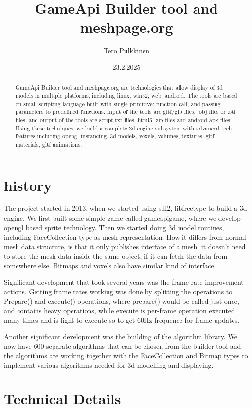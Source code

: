 \documentclass[11pt,twoside,a4paper]{article}
\begin{document}
\title{GameApi Builder tool and meshpage.org}
\author{Tero Pulkkinen}
\date{23.2.2025}
\maketitle
\begin{abstract}
  GameApi Builder tool and meshpage.org are technologies that allow display of 3d models in multiple platforms, including linux, win32, web, android. The tools are based on small scripting language built with single primitive: function call, and passing parameters to predefined functions. Input of the tools are gltf/glb files, .obj files or .stl files, and output of the tools are script.txt files, html5 .zip files and android apk files. Using these techniques, we build a complete 3d engine subsystem with advanced tech features including opengl instancing, 3d models, voxels, volumes, textures, gltf materials, gltf animations.
\end{abstract}

\section{history}
The project started in 2013, when we started using sdl2, libfreetype to build a 3d engine. We first built some simple game called gameapigame, where we develop opengl based sprite technology. Then we started doing 3d model routines, including FaceCollection type as mesh representation. How it differs from normal mesh data structure, is that it only publishes interface of a mesh, it doesn't need to store the mesh data inside the same object, if it can fetch the data from somewhere else. Bitmaps and voxels also have similar kind of interface.

Significant development that took several years was the frame rate improvement actions. Getting frame rates working was done by splitting the operations to Prepare() and execute() operations, where prepare() would be called just once, and contains heavy operations, while execute is per-frame operation executed many times and is light to execute so to get 60Hz frequence for frame updates.

Another significant development was the building of the algorithm library. We now have 600 separate algorithms that can be chosen from the builder tool and the algorithms are working together with the FaceCollection and Bitmap types to implement various algorithms needed for 3d modelling and displaying.

\section{Technical Details}
\end{document}
